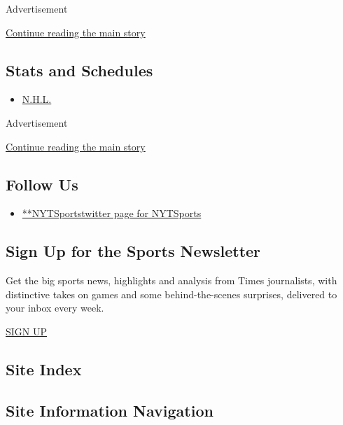 Advertisement

\protect\hyperlink{after-mid1}{Continue reading the main story}

\hypertarget{stats-and-schedules}{%
\subsection{Stats and Schedules}\label{stats-and-schedules}}

\begin{itemize}
\tightlist
\item
  \protect\hyperlink{}{N.H.L.}
\end{itemize}

Advertisement

\protect\hyperlink{after-mktg}{Continue reading the main story}

\hypertarget{follow-us}{%
\subsection{Follow Us}\label{follow-us}}

\begin{itemize}
\tightlist
\item
  \href{https://twitter.com/NYTSports}{**NYTSportstwitter page for
  NYTSports}
\end{itemize}

\hypertarget{sign-up-for-the-sports-newsletter}{%
\subsection{Sign Up for the Sports
Newsletter}\label{sign-up-for-the-sports-newsletter}}

Get the big sports news, highlights and analysis from Times journalists,
with distinctive takes on games and some behind-the-scenes surprises,
delivered to your inbox every week.

\href{/newsletters/signup/SP}{SIGN UP}

\hypertarget{site-index}{%
\subsection{Site Index}\label{site-index}}

\hypertarget{site-information-navigation}{%
\subsection{Site Information
Navigation}\label{site-information-navigation}}

